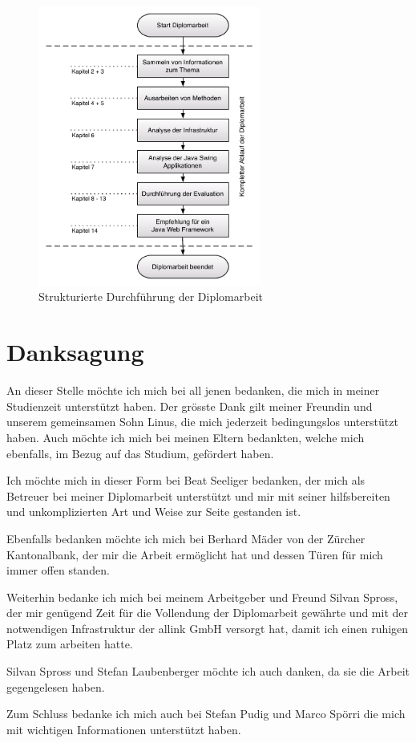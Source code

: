   \begin{figure}[htbp]
    \begin{center}
      \includegraphics[width=0.65\textwidth]{./image/durchfuehrungDerDiplomarbeit.pdf}
      \caption{Strukturierte Durchführung der Diplomarbeit}
      \label{img:durchfuehrungDerDiplomarbeit}
    \end{center}
  \end{figure}
  
  \clearpage
  
  \section{Danksagung}
  
  An dieser Stelle möchte ich mich bei all jenen bedanken, die mich in meiner
  Studienzeit unterstützt haben. Der grösste Dank gilt meiner Freundin und
  unserem gemeinsamen Sohn Linus, die mich jederzeit bedingungslos unterstützt
  haben. Auch möchte ich mich bei meinen Eltern bedankten, welche mich
  ebenfalls, im Bezug auf das Studium, gefördert haben.
  
  Ich möchte mich in dieser Form bei Beat Seeliger bedanken, der mich als
  Betreuer bei meiner Diplomarbeit unterstützt und mir mit seiner hilfsbereiten
  und unkomplizierten Art und Weise zur Seite gestanden ist.
  
  Ebenfalls bedanken möchte ich mich bei Berhard Mäder von der Zürcher
  Kantonalbank, der mir die Arbeit ermöglicht hat und dessen Türen für mich
  immer offen standen.
  
  Weiterhin bedanke ich mich bei meinem Arbeitgeber und Freund Silvan Spross,
  der mir genügend Zeit für die Vollendung der Diplomarbeit gewährte und mit der
  notwendigen Infrastruktur der allink GmbH versorgt hat, damit ich einen
  ruhigen Platz zum arbeiten hatte.
  
  Silvan Spross und Stefan Laubenberger möchte ich auch danken, da sie die
  Arbeit gegengelesen haben.
  
  Zum Schluss bedanke ich mich auch bei Stefan Pudig und Marco Spörri die
  mich mit wichtigen Informationen unterstützt haben.
    